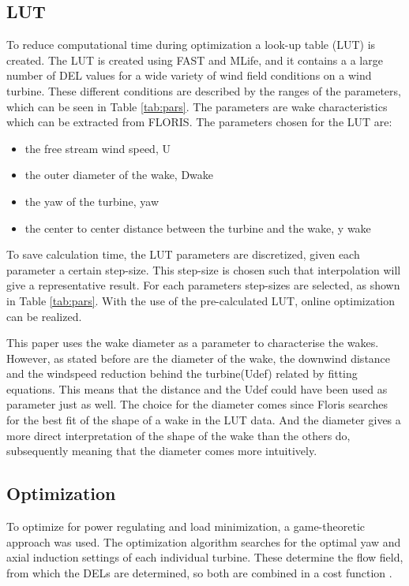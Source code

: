 \subsection{LUT} \label{sec:lut}
 To reduce computational time during optimization a look-up table (LUT) is created. The LUT is created using FAST and MLife, and it contains a a large number of DEL values for a wide variety of wind field conditions on a wind turbine.
These different conditions are described by the ranges of the parameters, which can be seen in Table \ref{tab:pars}. The parameters are wake characteristics which can be extracted from FLORIS. The parameters chosen for the LUT are:\begin{itemize}
	\item the free stream wind speed, U
	\item the outer diameter of the wake, Dwake
	\item the yaw of the turbine, yaw  
	\item the center to center distance between the turbine and the wake, y wake 
\end{itemize}   
 To save calculation time, the LUT parameters are discretized, given each parameter a certain step-size. This step-size is chosen such that interpolation will give a representative result. For each parameters step-sizes are selected, as shown in Table \ref{tab:pars}. With the use of the pre-calculated LUT, online optimization can be realized.



 This paper uses the wake diameter as a parameter to characterise the wakes. However, as stated before are the diameter of the wake, the downwind distance and the windspeed reduction behind the turbine(Udef) related by fitting equations. This means that the distance and the Udef could have been used as parameter just as well. The choice for the diameter comes since Floris searches for the best fit of the shape of a wake in the LUT data. And the diameter gives a more direct interpretation of the shape of the wake than the others do, subsequently meaning that the diameter comes more intuitively.

 
 

\subsection{Optimization} \label{sec:optimization}
To optimize for power regulating and load minimization, a game-theoretic approach was used\cite{Marden2013}. The optimization algorithm searches for the optimal yaw and axial induction settings of each individual turbine. These determine the flow field, from which the DELs are determined, so both are combined in a cost function \cite{Marden2013}\cite{Dijk2016}. 

